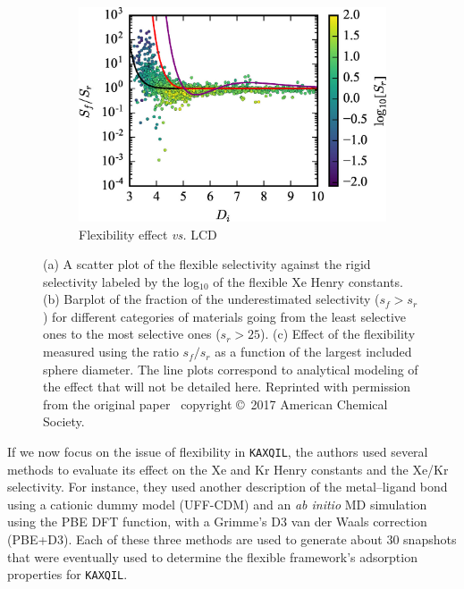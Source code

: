 \documentclass[main]{subfiles}
\begin{document}
\begin{figure}[ht]
\begin{subfigure}[b]{0.32\textwidth}
    \includegraphics[width=\textwidth]{figures/6-perspectives/s_ratio_LCD.jpg}
    \caption{Flexibility effect \emph{vs.} LCD}
  \end{subfigure}
  \caption{ (a) A scatter plot of the flexible selectivity against the rigid selectivity labeled by the log$_10$ of the flexible Xe Henry constants. (b) Barplot of the fraction of the underestimated selectivity ($s_f>s_r$) for different categories of materials going from the least selective ones to the most selective ones ($s_r>25$). (c) Effect of the flexibility measured using the ratio $s_f/s_r$ as a function of the largest included sphere diameter. The line plots correspond to analytical modeling of the effect that will not be detailed here. Reprinted with permission from the original paper~\cite{Witman_2017} copyright \copyright\ 2017 American Chemical Society. }\label{fgr:flexibility_study}
\end{figure}

If we now focus on the issue of flexibility in \texttt{KAXQIL}, the authors used several methods to evaluate its effect on the Xe and Kr Henry constants and the Xe/Kr selectivity. For instance, they used another description of the metal--ligand bond using a cationic dummy model (UFF-CDM) and an \emph{ab initio} MD simulation using the PBE DFT function,\autocite{Perdew_1996} with a Grimme's D3 van der Waals correction\autocite{Grimme_2010} (PBE+D3). Each of these three methods are used to generate about $30$ snapshots that were eventually used to determine the flexible framework's adsorption properties for \texttt{KAXQIL}.
\end{document}
